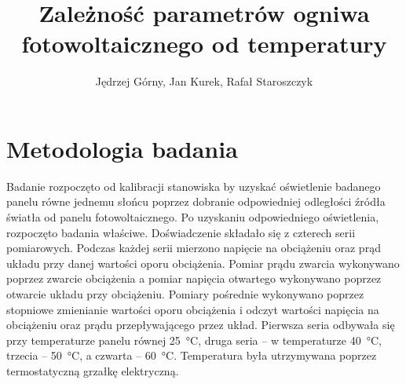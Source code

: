 \documentclass[a4, 12pt]{article}
\title{Zależność parametrów ogniwa fotowoltaicznego od temperatury}
\author{Jędrzej Górny, Jan Kurek, Rafał Staroszczyk}
\date{}
\begin{document}
	\maketitle
	\section{Metodologia badania}
	Badanie rozpoczęto od kalibracji stanowiska by uzyskać oświetlenie badanego panelu równe jednemu słońcu poprzez dobranie odpowiedniej odległości źródła światła od panelu fotowoltaicznego. Po uzyskaniu odpowiedniego oświetlenia, rozpoczęto badania właściwe. Doświadczenie składało się z czterech serii pomiarowych. Podczas każdej serii mierzono napięcie na obciążeniu oraz prąd układu przy danej wartości oporu obciążenia. Pomiar prądu zwarcia wykonywano poprzez zwarcie obciążenia a pomiar napięcia otwartego wykonywano poprzez otwarcie układu przy obciążeniu. Pomiary pośrednie wykonywano poprzez stopniowe zmienianie wartości oporu obciążenia i odczyt wartości napięcia na obciążeniu oraz prądu przepływającego przez układ. Pierwsza seria odbywała się przy temperaturze panelu równej \qty{25}{\degreeCelsius}, druga seria – w temperaturze \qty{40}{\degreeCelsius}, trzecia – \qty{50}{\degreeCelsius}, a czwarta – \qty{60}{\degreeCelsius}. Temperatura była utrzymywana poprzez termostatyczną grzałkę elektryczną.
	
	\pagebreak
\end{document}
